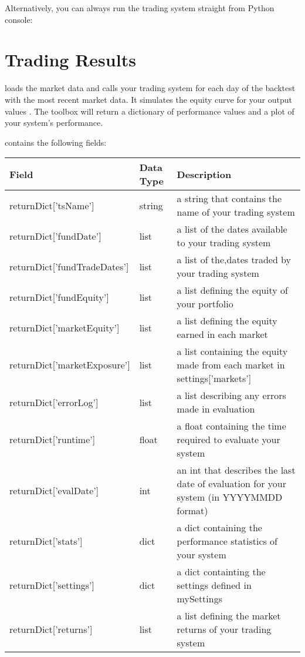 \documentclass[letterpaper,10pt,english]{sphinxmanual}
\begin{document}
Alternatively, you can always run the trading system straight from Python console:




\section{Trading Results}
\label{evaluate_system:trading-results}\label{evaluate_system:tradingresults-label}
 loads the market data and calls your trading system for each day of the backtest with the most recent market data. It simulates the equity curve for your output values . The toolbox will return a dictionary of performance values and a plot of your system's performance.

 contains the following fields:

\noindent\begin{tabulary}{\linewidth}{|L|L|L|}
\hline
\textsf{\relax 
Field
\unskip}\relax &\textsf{\relax 
Data Type
\unskip}\relax &\textsf{\relax 
Description
\unskip}\relax \\
\hline
returnDict{[}'tsName'{]}
&
string
&
a string that contains the name of your trading
system
\\
\hline
returnDict{[}'fundDate'{]}
&
list
&
a list of the dates available to your trading
system
\\
\hline
returnDict{[}'fundTradeDates'{]}
&
list
&
a list of the,dates traded by your trading
system
\\
\hline
returnDict{[}'fundEquity'{]}
&
list
&
a list defining the equity of your portfolio
\\
\hline
returnDict{[}'marketEquity'{]}
&
list
&
a list defining the equity earned in each market
\\
\hline
returnDict{[}'marketExposure'{]}
&
list
&
a list containing the equity made from each
market in settings{[}'markets'{]}
\\
\hline
returnDict{[}'errorLog'{]}
&
list
&
a list describing any errors made in evaluation
\\
\hline
returnDict{[}'runtime'{]}
&
float
&
a float containing the time required to evaluate
your system
\\
\hline
returnDict{[}'evalDate'{]}
&
int
&
an int that describes the last date of
evaluation for your system (in YYYYMMDD format)
\\
\hline
returnDict{[}'stats'{]}
&
dict
&
a dict containing the performance statistics of
your system
\\
\hline
returnDict{[}'settings'{]}
&
dict
&
a dict containting the settings defined in
mySettings
\\
\hline
returnDict{[}'returns'{]}
&
list
&
a list defining the market returns of your
trading system
\\
\hline\end{tabulary}
\end{document}
